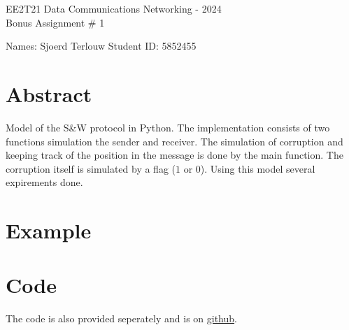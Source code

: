 \documentclass[11pt,fleqn]{article}
\begin{document}
	\begin{center}
		{\Large EE2T21 Data Communications Networking - 2024\\[0.1em]
			Bonus Assignment \# 1 \\}
	\end{center}

    \parbox[l][17mm][t]{\textwidth}{Names: Sjoerd Terlouw \hspace{6.66cm}
			Student ID: 5852455}
	\section{Abstract}
    Model of the S\&W protocol in Python. The implementation consists of two functions simulation the sender and receiver. The simulation of corruption and keeping track of the position in the message is done by the main function. The corruption itself is simulated by a flag ($1$ or $0$). 
    Using this model several expirements done.

    \section{Example}
    \begin{figure}
        
    \end{figure}

    \newpage
    \section{Code}
    The code is also provided seperately and is on \href{https://github.com/SjdTl/Data-communications-networking.git}{\color{blue}github}.
    \inputminted[breaklines=true]{python3}{Stop-and-wait_protocol.py}
\end{document}
